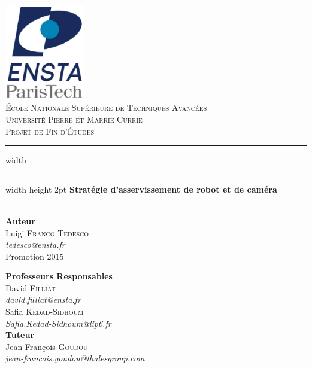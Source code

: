 \begin{titlepage}

	\begin{center}
	
	
		\includegraphics[width=0.26\textwidth]{enstalogo.eps}\\[1cm]    
		\textsc{\large École Nationale Supérieure de Techniques Avancées}\\[1.5cm]

		\textsc{\large Université Pierre et Marrie Currie}\\[1cm]
	
		\textsc{\Large Projet de Fin d'Études}\\[0.5cm]
	
	        \hrule width \hsize \kern 1mm \hrule width \hsize height 2pt
                \vfill
		{ \huge \bfseries    Stratégie d'asservissement de robot et de caméra}\\[0.15cm]
	
		      \HRule \\[1.5cm]
	                
		\begin{minipage}{0.4\textwidth}
			\begin{flushleft} \large
				\textbf{Auteur}\\
				Luigi \textsc{Franco Tedesco}\\
				      \textit{tedesco@ensta.fr}\\
				Promotion 2015
			\end{flushleft}
		\end{minipage}
		\begin{minipage}{0.55\textwidth}
			\begin{flushright} \large
				\textbf{Professeurs Responsables} \\
				David \textsc{Filliat} \\
				\textit{david.filliat@ensta.fr}\\[0.1cm]
				Safia \textsc{Kedad-Sidhoum} \\
				\textit{Safia.Kedad-Sidhoum@lip6.fr}\\[0.1cm]
				\textbf{Tuteur} \\
				Jean-François \textsc{Goudou} \\
				\textit{jean-francois.goudou@thalesgroup.com}\\
			\end{flushright}
		\end{minipage}


\end{center}
\end{titlepage}
